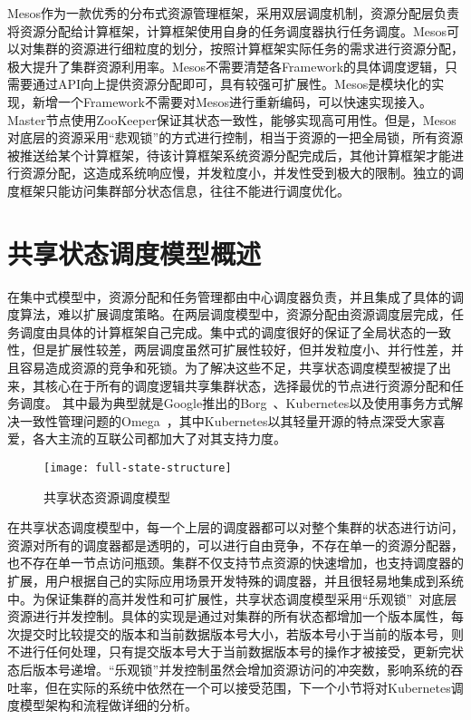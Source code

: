 Mesos作为一款优秀的分布式资源管理框架，采用双层调度机制，资源分配层负责将资源分配给计算框架，计算框架使用自身的任务调度器执行任务调度。Mesos可以对集群的资源进行细粒度的划分，按照计算框架实际任务的需求进行资源分配，极大提升了集群资源利用率。Mesos不需要清楚各Framework的具体调度逻辑，只需要通过API向上提供资源分配即可，具有较强可扩展性。Mesos是模块化的实现，新增一个Framework不需要对Mesos进行重新编码，可以快速实现接入。Master节点使用ZooKeeper保证其状态一致性，能够实现高可用性。但是，Mesos对底层的资源采用“悲观锁”的方式进行控制，相当于资源的一把全局锁，所有资源被推送给某个计算框架，待该计算框架系统资源分配完成后，其他计算框架才能进行资源分配，这造成系统响应慢，并发粒度小，并发性受到极大的限制。独立的调度框架只能访问集群部分状态信息，往往不能进行调度优化。

\section{共享状态调度模型概述}
在集中式模型中，资源分配和任务管理都由中心调度器负责，并且集成了具体的调度算法，难以扩展调度策略。在两层调度模型中，资源分配由资源调度层完成，任务调度由具体的计算框架自己完成。集中式的调度很好的保证了全局状态的一致性，但是扩展性较差，两层调度虽然可扩展性较好，但并发粒度小、并行性差，并且容易造成资源的竞争和死锁。为了解决这些不足，共享状态调度模型被提了出来，其核心在于所有的调度逻辑共享集群状态，选择最优的节点进行资源分配和任务调度。
其中最为典型就是Google推出的Borg~\cite{KUB2015}、Kubernetes以及使用事务方式解决一致性管理问题的Omega~\cite{Burns2016Borg}，其中Kubernetes以其轻量开源的特点深受大家喜爱，各大主流的互联公司都加大了对其支持力度。

\begin{figure}[H] %
	\centering
	\texttt{[image: full-state-structure]}
	\caption{共享状态资源调度模型}
\end{figure}
在共享状态调度模型中，每一个上层的调度器都可以对整个集群的状态进行访问，资源对所有的调度器都是透明的，可以进行自由竞争，不存在单一的资源分配器，也不存在单一节点访问瓶颈。集群不仅支持节点资源的快速增加，也支持调度器的扩展，用户根据自己的实际应用场景开发特殊的调度器，并且很轻易地集成到系统中。为保证集群的高并发性和可扩展性，共享状态调度模型采用“乐观锁”~\cite{Halici1991An}对底层资源进行并发控制。具体的实现是通过对集群的所有状态都增加一个版本属性，每次提交时比较提交的版本和当前数据版本号大小，若版本号小于当前的版本号，则不进行任何处理，只有提交版本号大于当前数据版本号的操作才被接受，更新完状态后版本号递增。“乐观锁”并发控制虽然会增加资源访问的冲突数，影响系统的吞吐率，但在实际的系统中依然在一个可以接受范围，下一个小节将对Kubernetes调度模型架构和流程做详细的分析。

